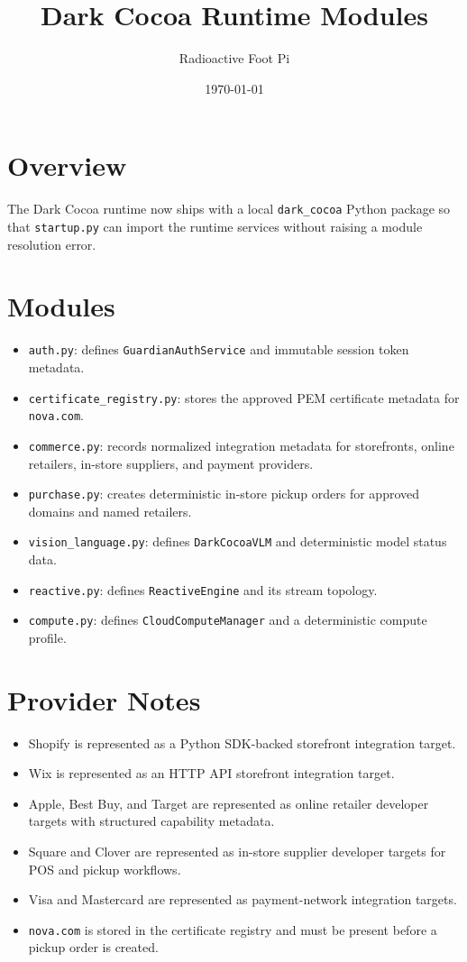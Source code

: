 \documentclass{article}
\title{Dark Cocoa Runtime Modules}
\author{Radioactive Foot Pi}
\date{\today}
\begin{document}
\maketitle

\section*{Overview}
The Dark Cocoa runtime now ships with a local \texttt{dark\_cocoa} Python package so that
\texttt{startup.py} can import the runtime services without raising a module resolution error.

\section*{Modules}
\begin{itemize}
  \item \texttt{auth.py}: defines \texttt{GuardianAuthService} and immutable session token metadata.
  \item \texttt{certificate\_registry.py}: stores the approved PEM certificate metadata for \texttt{nova.com}.
  \item \texttt{commerce.py}: records normalized integration metadata for storefronts, online retailers, in-store suppliers, and payment providers.
  \item \texttt{purchase.py}: creates deterministic in-store pickup orders for approved domains and named retailers.
  \item \texttt{vision\_language.py}: defines \texttt{DarkCocoaVLM} and deterministic model status data.
  \item \texttt{reactive.py}: defines \texttt{ReactiveEngine} and its stream topology.
  \item \texttt{compute.py}: defines \texttt{CloudComputeManager} and a deterministic compute profile.
\end{itemize}

\section*{Provider Notes}
\begin{itemize}
  \item Shopify is represented as a Python SDK-backed storefront integration target.
  \item Wix is represented as an HTTP API storefront integration target.
  \item Apple, Best Buy, and Target are represented as online retailer developer targets with structured capability metadata.
  \item Square and Clover are represented as in-store supplier developer targets for POS and pickup workflows.
  \item Visa and Mastercard are represented as payment-network integration targets.
  \item \texttt{nova.com} is stored in the certificate registry and must be present before a pickup order is created.
\end{itemize}
\end{document}
